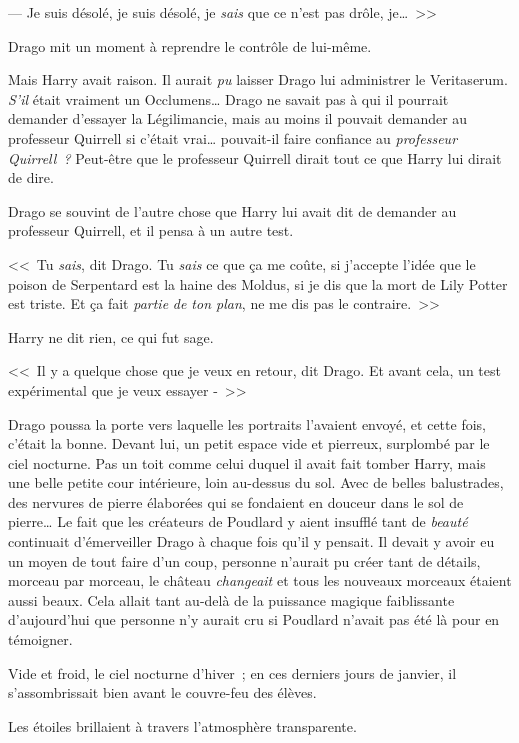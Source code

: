 --- Je suis désolé, je suis désolé, je \emph{sais} que ce n'est pas drôle, je…~>>

Drago mit un moment à reprendre le contrôle de lui-même.

Mais Harry avait raison. Il aurait \emph{pu} laisser Drago lui administrer le Veritaserum. \emph{S'il} était vraiment un Occlumens… Drago ne savait pas à qui il pourrait demander d'essayer la Légilimancie, mais au moins il pouvait demander au professeur Quirrell si c'était vrai… pouvait-il faire confiance au \emph{professeur Quirrell~?} Peut-être que le professeur Quirrell dirait tout ce que Harry lui dirait de dire.

Drago se souvint de l'autre chose que Harry lui avait dit de demander au professeur Quirrell, et il pensa à un autre test.

<<~Tu \emph{sais}, dit Drago. Tu \emph{sais} ce que ça me coûte, si j'accepte l'idée que le poison de Serpentard est la haine des Moldus, si je dis que la mort de Lily Potter est triste. Et ça fait \emph{partie} \emph{de ton plan}, ne me dis pas le contraire.~>>

Harry ne dit rien, ce qui fut sage.

<<~Il y a quelque chose que je veux en retour, dit Drago. Et avant cela, un test expérimental que je veux essayer -~>>

\later

Drago poussa la porte vers laquelle les portraits l'avaient envoyé, et cette fois, c'était la bonne. Devant lui, un petit espace vide et pierreux, surplombé par le ciel nocturne. Pas un toit comme celui duquel il avait fait tomber Harry, mais une belle petite cour intérieure, loin au-dessus du sol. Avec de belles balustrades, des nervures de pierre élaborées qui se fondaient en douceur dans le sol de pierre… Le fait que les créateurs de Poudlard y aient insufflé tant de \emph{beauté} continuait d'émerveiller Drago à chaque fois qu'il y pensait. Il devait y avoir eu un moyen de tout faire d'un coup, personne n'aurait pu créer tant de détails, morceau par morceau, le château \emph{changeait} et tous les nouveaux morceaux étaient aussi beaux. Cela allait tant au-delà de la puissance magique faiblissante d'aujourd'hui que personne n'y aurait cru si Poudlard n'avait pas été là pour en témoigner.

Vide et froid, le ciel nocturne d'hiver~; en ces derniers jours de janvier, il s'assombrissait bien avant le couvre-feu des élèves.

Les étoiles brillaient à travers l'atmosphère transparente.


